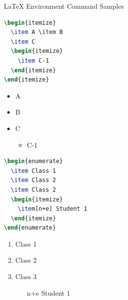 \documentclass{beamer}
\begin{document}
\begin{frame}[fragile]{\LaTeX{} Environment Command Samples}
    \begin{minipage}{0.5\linewidth}
\begin{lstlisting}[language=TeX]
\begin{itemize}
  \item A \item B
  \item C
  \begin{itemize}
    \item C-1
  \end{itemize}
\end{itemize}
\end{lstlisting}
    \end{minipage}\hspace{1cm}
    \begin{minipage}{0.3\linewidth}
        \begin{itemize}
            \item A
            \item B
            \item C
            \begin{itemize}
                \item C-1
            \end{itemize}
        \end{itemize}
    \end{minipage}
    \medskip
    \pause
    \begin{minipage}{0.5\linewidth}
\begin{lstlisting}[language=TeX]
\begin{enumerate}
  \item Class 1 
  \item Class 2
  \item Class 2
  \begin{itemize}
    \item[n+e] Student 1
  \end{itemize}
\end{enumerate}
\end{lstlisting}
    \end{minipage}\hspace{1cm}
    \begin{minipage}{0.3\linewidth}
        \begin{enumerate}
            \item Class 1
            \item Class 2
            \item Class 3
            \begin{itemize}
                \item[n+e] Student 1
            \end{itemize}
        \end{enumerate}
    \end{minipage}
\end{frame}
\end{document}
